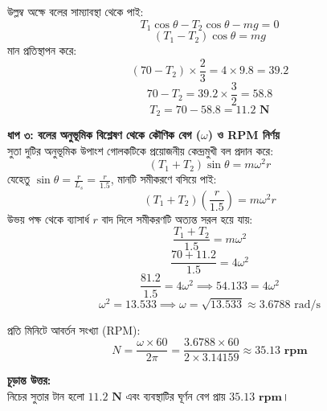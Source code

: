 \documentclass[12pt, a4paper]{article}
\begin{document}
\begin{tcolorbox}[solutionbox={সমাধান (Solution)}]
\begin{center}
\end{center}
\vspace{1em}

উল্লম্ব অক্ষে বলের সাম্যাবস্থা থেকে পাই:
$$T_1 \cos\theta - T_2 \cos\theta - mg = 0$$
$$(T_1 - T_2)\cos\theta = mg$$
মান প্রতিস্থাপন করে:
$$(70 - T_2) \times \frac{2}{3} = 4 \times 9.8 = 39.2$$ 
$$70 - T_2 = 39.2 \times \frac{3}{2} = 58.8$$ 
$$T_2 = 70 - 58.8 = \mathbf{11.2\text{ N}}$$

\vspace{0.5em}
\noindent
\textbf{ধাপ ৩: বলের অনুভূমিক বিশ্লেষণ থেকে কৌণিক বেগ ($\omega$) ও RPM নির্ণয়} \\
সুতা দুটির অনুভূমিক উপাংশ গোলকটিকে প্রয়োজনীয় কেন্দ্রমুখী বল প্রদান করে:
$$(T_1 + T_2)\sin\theta = m \omega^2 r$$
যেহেতু $\sin\theta = \frac{r}{L_s} = \frac{r}{1.5}$, মানটি সমীকরণে বসিয়ে পাই:
$$(T_1 + T_2) \left(\frac{r}{1.5}\right) = m \omega^2 r$$
উভয় পক্ষ থেকে ব্যাসার্ধ $r$ বাদ দিলে সমীকরণটি অত্যন্ত সরল হয়ে যায়:
$$\frac{T_1 + T_2}{1.5} = m \omega^2$$ 
$$\frac{70 + 11.2}{1.5} = 4 \omega^2$$ 
$$\frac{81.2}{1.5} = 4 \omega^2 \implies 54.133 = 4 \omega^2$$ 
$$\omega^2 = 13.533 \implies \omega = \sqrt{13.533} \approx 3.6788\text{ rad/s}$$

প্রতি মিনিটে আবর্তন সংখ্যা (RPM):
$$N = \frac{\omega \times 60}{2\pi} = \frac{3.6788 \times 60}{2 \times 3.14159} \approx \mathbf{35.13\text{ rpm}}$$

\vspace{1em}
\begin{tcolorbox}[answerbox]
\textbf{চূড়ান্ত উত্তর:} \\
নিচের সুতার টান হলো $\mathbf{11.2\text{ N}}$ এবং ব্যবস্থাটির ঘূর্ণন বেগ প্রায় $\mathbf{35.13\text{ rpm}}$।
\end{tcolorbox}
\end{tcolorbox}
\end{document}
